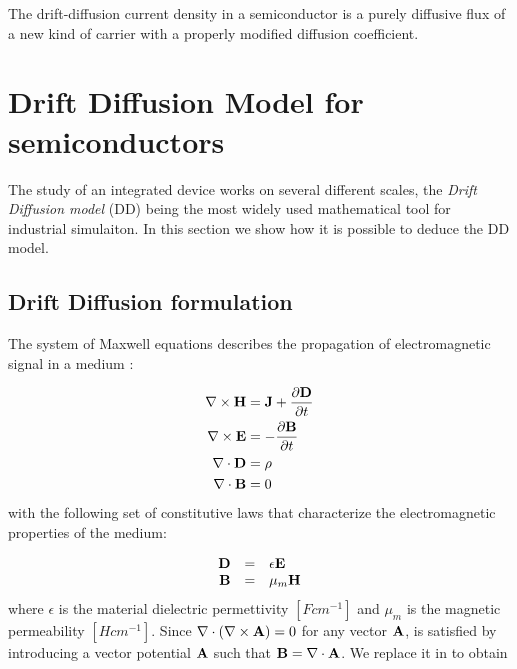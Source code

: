 \begin{Osservazione}
The drift-diffusion current density in a semiconductor is a purely diffusive flux of a new kind of carrier with a properly modified diffusion coefficient. 
\end{Osservazione}


\section{Drift Diffusion Model for semiconductors}
\label{section: dd model for semi}

The study of an integrated device works on several different scales, the \textit{Drift Diffusion model} (DD) being the most widely used mathematical tool for industrial simulaiton. In this section we show how it is possible to deduce the DD model.

\subsection{Drift Diffusion formulation}
 The system of Maxwell equations describes the propagation of electromagnetic signal in a medium \cite{Jackson:ElettroClassica}:

\begin{align}
\nabla \times \mathbf{H} & =  \mathbf{J} + \dfrac{\partial \mathbf{D}}{\partial t} \label{eq: magnetic equation} \\ 
\nabla \times \mathbf{E} & =  - \dfrac{\partial \mathbf{B}}{\partial t} \label{eq: ampere law}\\ 
\nabla \cdot \mathbf{D} & =  \rho \label{eq: gauss law}\\ 
\nabla \cdot \mathbf{B} &  =  0 \label{eq: no magetic charge law}
\end{align}
with the following set of constitutive laws that characterize the electromagnetic properties of the medium:

\begin{equation}
\begin{array}{rcl}
\mathbf{D} & = & \epsilon \mathbf{E} \\
\mathbf{B} & = & \mu_m \mathbf{H} \label{eq: magnetic costitutive}
\end{array}
\end{equation}
where $\epsilon$ is the material dielectric permettivity $[F cm^{-1}]$ and $\mu_m$ is the magnetic permeability $[H cm^{-1}]$. Since $\nabla \cdot (\nabla \times \mathbf{A})=0$ for any vector $\mathbf{A}$,  is satisfied by introducing a vector potential $\mathbf{A}$ such that $\mathbf{B}= \nabla \cdot \mathbf{A}$. We replace it in  to obtain

